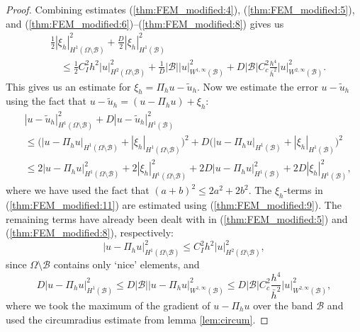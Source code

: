 \documentclass{article}
\theoremstyle{remark}
\def \d {{\rm d}}
\def\dx{\,\d x }
\def\B{\mathcal{B}}
\def\WIi{W^{1,\infty}}
\def\WIIi{W^{2,\infty}}
\def\tu{\tilde{u}}
\def\width{\bar{h}}
\begin{document}
\begin{proof}
    Combining estimates (\ref{thm:FEM_modified:4}), (\ref{thm:FEM_modified:5}), and (\ref{thm:FEM_modified:6})--(\ref{thm:FEM_modified:8}) gives us 
    \begin{equation}
    \label{thm:FEM_modified:9}
    \begin{split}
    &\frac{1}{2}|\xi_h|^2_{H^1(\Omega\setminus\B)} +\frac{D}{2}|\xi_h|^2_{H^1(\B)}\\
    &\quad\leq  \frac{1}{2}C_I^2h^2|u|_{H^2(\Omega\setminus\B)}^2 +\frac{1}{D}|\B| |u|_{\WIi(\B)}^2 +D|\B|C_c^2 \frac{h^4}{\width^2} |u|^2_{\WIIi(\B)}.
    \end{split}
    \end{equation}
    This gives us an estimate for $\xi_h = \Pi_h u - \tu_h$. Now we estimate the error $u-\tu_h$ using the fact that $u-\tu_h =(u-\Pi_h u)+\xi_h$:
    \begin{equation}
    \begin{split}
    \label{thm:FEM_modified:11}
    &|u-\tu_h|^2_{H^1(\Omega\setminus\B)} +D|u-\tu_h|^2_{H^1(\B)}\\ &\leq \big(|u-\Pi_h u|_{H^1(\Omega\setminus\B)} + |\xi_h|_{H^1(\Omega\setminus\B)}\big)^2 +D\big(|u-\Pi_h u|_{H^1(\B)} +|\xi_h|_{H^1(\B)}\big)^2\\
    &\leq 2|u-\Pi_h u|_{H^1(\Omega\setminus\B)}^2 + 2|\xi_h|_{H^1(\Omega\setminus\B)}^2 +2D|u-\Pi_h u|_{H^1(\B)}^2 +2D|\xi_h|_{H^1(\B)}^2,
    \end{split}
    \end{equation}
    where we have used the fact that $(a+b)^2\leq 2a^2+2b^2$. The $\xi_h$-terms in (\ref{thm:FEM_modified:11}) are estimated using (\ref{thm:FEM_modified:9}). The remaining terms have already been dealt with in (\ref{thm:FEM_modified:5}) and (\ref{thm:FEM_modified:8}), respectively:
    \begin{equation}
    \label{thm:FEM_modified:12}
    |u-\Pi_h u|_{H^1(\Omega\setminus\B)}^2\leq C_I^2h^2|u|^2_{H^2(\Omega\setminus\B)},
    \end{equation}
    since $\Omega\setminus\B$ contains only `nice' elements, and
    \begin{equation}
    \label{thm:FEM_modified:13}
    D|u-\Pi_h u|^2_{H^1(\B)} \leq D|\B||u-\Pi_h u|^2_{\WIi(\B)}\leq D|\B| C_c^2 \frac{h^4}{\width^2}|u|^2_{\WIIi(\B)},
    \end{equation}
    where we took the maximum of the gradient of $u - \Pi_h u$ over the band $\B$ and used the circumradius estimate from lemma \ref{lem:circum}.

\end{proof}
\end{document}
